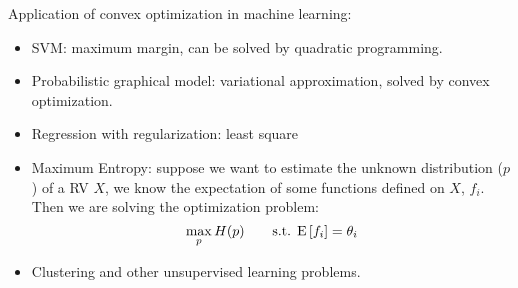 \documentclass{report}
\begin{document}
Application of convex optimization in machine learning: 
\begin{itemize}
\item SVM: maximum margin, can be solved by quadratic programming. 
\item Probabilistic graphical model: variational approximation, solved by convex optimization. 
\item Regression with regularization: least square
\item Maximum Entropy: suppose we want to estimate the unknown distribution ($p$) of a RV $X$, we know the expectation of some functions defined on $X$, $f_i$. Then we are solving the optimization problem: 
\begin{equation}
\max_p H(p) \qquad \text{s.t. } {\rm E}\,[f_i] = \theta_i
\end{equation}
\item Clustering and other unsupervised learning problems. 
\end{itemize}
\end{document}
